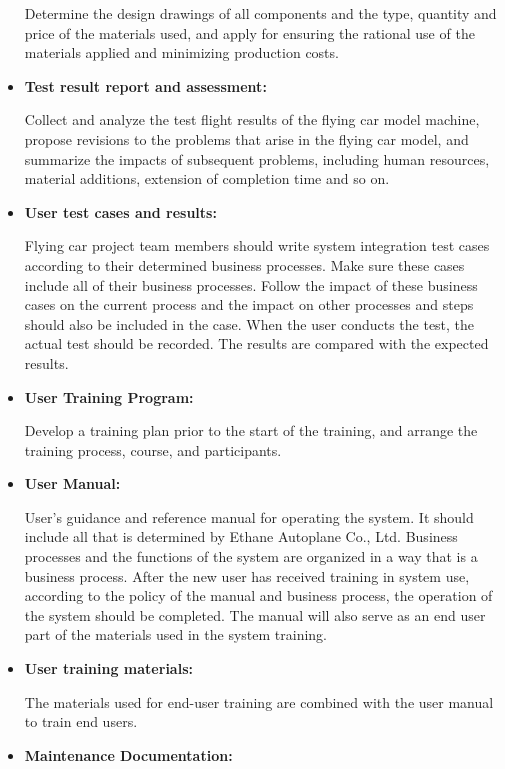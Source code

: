 \begin{itemize}
Determine the design drawings of all components and the type, quantity and price of the materials used, and apply for ensuring the rational use of the materials applied and minimizing production costs.

\item \textbf{Test result report and assessment:}

Collect and analyze the test flight results of the flying car model machine, propose revisions to the problems that arise in the flying car model, and summarize the impacts of subsequent problems, including human resources, material additions, extension of completion time and so on.

\item \textbf{User test cases and results:}

Flying car project team members should write system integration test cases according to their determined business processes. Make sure these cases include all of their business processes. Follow the impact of these business cases on the current process and the impact on other processes and steps should also be included in the case. When the user conducts the test, the actual test should be recorded. The results are compared with the expected results.

\item \textbf{User Training Program:}

Develop a training plan prior to the start of the training, and arrange the training process, course, and participants. 

\item \textbf{User Manual:}

User's guidance and reference manual for operating the system. It should include all that is determined by Ethane Autoplane Co., Ltd. Business processes and the functions of the system are organized in a way that is a business process. After the new user has received training in system use, according to the policy of the manual and business process, the operation of the system should be completed. The manual will also serve as an end user part of the materials used in the system training.

\item \textbf{User training materials:}

The materials used for end-user training are combined with the user manual to train end users.

\item \textbf{Maintenance Documentation:}


\end{itemize}
